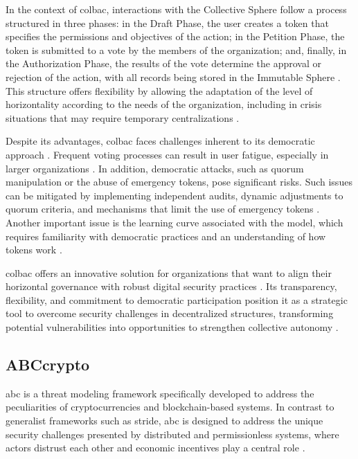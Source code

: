 In the context of \gls{colbac}, interactions with the Collective Sphere follow a
process structured in three phases: in the Draft Phase, the user creates a token
that specifies the permissions and objectives of the action; in the Petition
Phase, the token is submitted to a vote by the members of the organization; and,
finally, in the Authorization Phase, the results of the vote determine the
approval or rejection of the action, with all records being stored in the
Immutable Sphere \cite{Colbac}. This structure offers flexibility by allowing
the adaptation of the level of horizontality according to the needs of the
organization, including in crisis situations that may require temporary
centralizations \cite{Colbac}.

Despite its advantages, \gls{colbac} faces challenges inherent to its democratic
approach \cite{Colbac}. Frequent voting processes can result in user fatigue,
especially in larger organizations \cite{Colbac, EverydayRevolutions}. In
addition, democratic attacks, such as quorum manipulation or the abuse of
emergency tokens, pose significant risks. Such issues can be mitigated by
implementing independent audits, dynamic adjustments to quorum criteria, and
mechanisms that limit the use of emergency tokens \cite{Colbac}. Another
important issue is the learning curve associated with the model, which requires
familiarity with democratic practices and an understanding of how tokens work
\cite{Colbac}.

\gls{colbac} offers an innovative solution for organizations that want to align
their horizontal governance with robust digital security practices
\cite{Colbac}. Its transparency, flexibility, and commitment to democratic
participation position it as a strategic tool to overcome security challenges in
decentralized structures, transforming potential vulnerabilities into
opportunities to strengthen collective autonomy \cite{Colbac,
EverydayRevolutions}.

\subsection{ABCcrypto}
\label{subsec:abccrypto}

\gls{abc} is a threat modeling framework specifically developed to address the
peculiarities of cryptocurrencies and blockchain-based systems. In contrast to
generalist frameworks such as \gls{stride}, \gls{abc} is designed to address the
unique security challenges presented by distributed and permissionless systems,
where actors distrust each other and economic incentives play a central role
\cite{AbcCrypto}.

